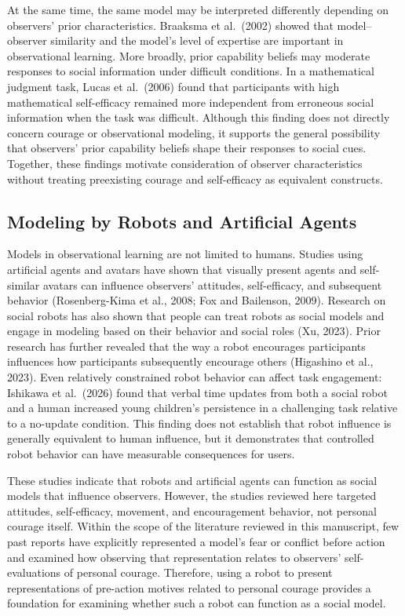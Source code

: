 \documentclass[utf8]{FrontiersinHarvard}
\begin{document}
At the same time, the same model may be interpreted differently depending on observers' prior characteristics. Braaksma et al.~(2002) showed that model--observer similarity and the model's level of expertise are important in observational learning. More broadly, prior capability beliefs may moderate responses to social information under difficult conditions. In a mathematical judgment task, Lucas et al.~(2006) found that participants with high mathematical self-efficacy remained more independent from erroneous social information when the task was difficult. Although this finding does not directly concern courage or observational modeling, it supports the general possibility that observers' prior capability beliefs shape their responses to social cues. Together, these findings motivate consideration of observer characteristics without treating preexisting courage and self-efficacy as equivalent constructs.

\subsection{Modeling by Robots and Artificial Agents}\label{modeling-by-robots-and-artificial-agents}

Models in observational learning are not limited to humans. Studies using artificial agents and avatars have shown that visually present agents and self-similar avatars can influence observers' attitudes, self-efficacy, and subsequent behavior (Rosenberg-Kima et al., 2008; Fox and Bailenson, 2009). Research on social robots has also shown that people can treat robots as social models and engage in modeling based on their behavior and social roles (Xu, 2023). Prior research has further revealed that the way a robot encourages participants influences how participants subsequently encourage others (Higashino et al., 2023). Even relatively constrained robot behavior can affect task engagement: Ishikawa et al.~(2026) found that verbal time updates from both a social robot and a human increased young children's persistence in a challenging task relative to a no-update condition. This finding does not establish that robot influence is generally equivalent to human influence, but it demonstrates that controlled robot behavior can have measurable consequences for users.

These studies indicate that robots and artificial agents can function as social models that influence observers. However, the studies reviewed here targeted attitudes, self-efficacy, movement, and encouragement behavior, not personal courage itself. Within the scope of the literature reviewed in this manuscript, few past reports have explicitly represented a model's fear or conflict before action and examined how observing that representation relates to observers' self-evaluations of personal courage. Therefore, using a robot to present representations of pre-action motives related to personal courage provides a foundation for examining whether such a robot can function as a social model.
\end{document}
